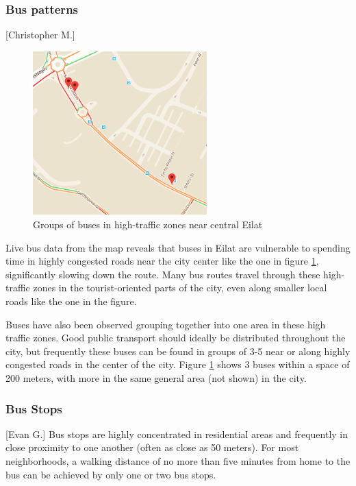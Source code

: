 \documentclass[12pt]{article}                               %
\begin{document}
\subsubsection{Bus patterns}[Christopher M.]
\begin{figure}[H]
    \centering
    \includegraphics[width=0.6\textwidth]{images/bus_clump_1.png}
    \caption{Groups of buses in high-traffic zones near central Eilat}
    \label{img:bus_clump_1}
\end{figure}

Live bus data from the map reveals that buses in Eilat are vulnerable to spending time in highly congested roads near the city center like the one in figure \ref{img:bus_clump_1}, significantly slowing down the route. Many bus routes travel through these high-traffic zones in the tourist-oriented parts of the city, even along smaller local roads like the one in the figure.

Buses have also been observed grouping together into one area in these high traffic zones. Good public transport should ideally be distributed throughout the city, but frequently these buses can be found in groups of 3-5 near or along highly congested roads in the center of the city. Figure \ref{img:bus_clump_1} shows 3 buses within a space of 200 meters, with more in the same general area (not shown) in the city.

\subsubsection{Bus Stops}[Evan G.]
Bus stops are highly concentrated in residential areas and frequently in close proximity to one another (often as close as 50 meters). For most neighborhoods, a walking distance of no more than five minutes from home to the bus can be achieved by only one or two bus stops.
\end{document}
